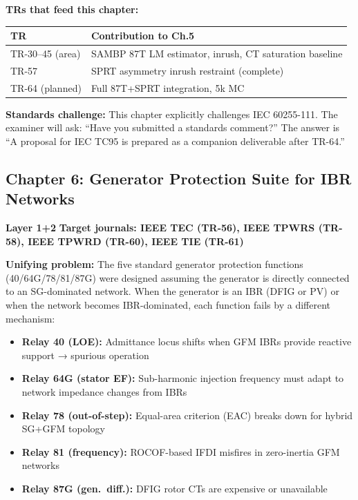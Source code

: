 \documentclass[11pt, a4paper]{article}
\newcommand{\chtag}[2]{\colorbox{#1}{\color{white}\textbf{\small #2}}}
\begin{document}
\textbf{TRs that feed this chapter:}
\begin{center}
\begin{tabular}{ll}
\toprule
TR & Contribution to Ch.5 \\
\midrule
TR-30--45 (area) & SAMBP 87T LM estimator, inrush, CT saturation baseline \\
TR-57 & SPRT asymmetry inrush restraint (complete) \\
TR-64 (planned) & Full 87T+SPRT integration, 5k MC \\
\bottomrule
\end{tabular}
\end{center}

\textbf{Standards challenge:} This chapter explicitly challenges IEC 60255-111.
The examiner will ask: ``Have you submitted a standards comment?''  The answer
is ``A proposal for IEC TC95 is prepared as a companion deliverable after TR-64.''

\subsection{Chapter 6: Generator Protection Suite for IBR Networks}
\label{sec:ch6}

\chtag{C5col}{Layer 1+2} \quad \textbf{Target journals: IEEE TEC (TR-56), IEEE TPWRS (TR-58), IEEE TPWRD (TR-60), IEEE TIE (TR-61)}

\textbf{Unifying problem:} The five standard generator protection functions
(40/64G/78/81/87G) were designed assuming the generator is directly connected
to an SG-dominated network.  When the generator is an IBR (DFIG or PV) or when
the network becomes IBR-dominated, each function fails by a different mechanism:
\begin{itemize}[nosep]
  \item \textbf{Relay 40 (LOE):} Admittance locus shifts when GFM IBRs provide reactive support → spurious operation
  \item \textbf{Relay 64G (stator EF):} Sub-harmonic injection frequency must adapt to network impedance changes from IBRs
  \item \textbf{Relay 78 (out-of-step):} Equal-area criterion (EAC) breaks down for hybrid SG+GFM topology
  \item \textbf{Relay 81 (frequency):} ROCOF-based IFDI misfires in zero-inertia GFM networks
  \item \textbf{Relay 87G (gen.\ diff.):} DFIG rotor CTs are expensive or unavailable
\end{itemize}
\end{document}
